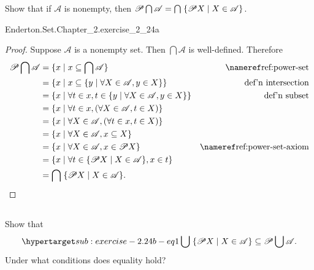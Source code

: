 \documentclass{report}
\begin{document}
  Show that if $\mathscr{A}$ is nonempty, then
    $\mathscr{P}\bigcap\mathscr{A} =
      \bigcap\; \{\mathscr{P}X \mid X \in \mathscr{A} \}$.

    {Enderton.Set.Chapter\_2.exercise\_2\_24a}

  \begin{proof}
    Suppose $\mathscr{A}$ is a nonempty set.
    Then $\bigcap \mathscr{A}$ is well-defined.
    Therefore
      \begin{align*}
        \powerset{\bigcap\mathscr{A}}
          & = \{ x \mid x \subseteq \bigcap \mathscr{A} \}
            & \textref{ref:power-set} \\
          & = \{ x \mid x \subseteq
            \{ y \mid \forall X \in \mathscr{A}, y \in X \} \}
            & \text{def'n intersection} \\
          & = \{ x \mid \forall t \in x,
            t \in \{ y \mid \forall X \in \mathscr{A}, y \in X \} \}
            & \text{def'n subset} \\
          & = \{ x \mid \forall t \in x,
            (\forall X \in \mathscr{A}, t \in X) \} \\
          & = \{ x \mid \forall X \in \mathscr{A},
            (\forall t \in x, t \in X) \} \\
          & = \{ x \mid \forall X \in \mathscr{A}, x \subseteq X \} \\
          & = \{ x \mid \forall X \in \mathscr{A}, x \in \powerset{X} \}
            & \textref{ref:power-set-axiom} \\
          & = \{ x \mid
            \forall t \in \{ \powerset{X} \mid X \in \mathscr{A} \}, x \in t \} \\
          & = \bigcap\; \{\powerset{X} \mid X \in \mathscr{A}\}.
      \end{align*}
  \end{proof}

\subsection{}%

  Show that
    \begin{equation}
      \hyperlabel{sub:exercise-2.24b-eq1}
      \bigcup\; \{ \powerset{X} \mid X \in \mathscr{A} \} \subseteq
        \powerset{\bigcup\mathscr{A}}.
    \end{equation}
  Under what conditions does equality hold?
\end{document}
